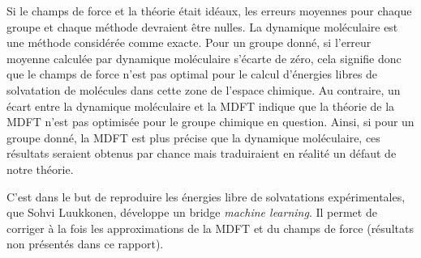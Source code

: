 Si le champs de force et la théorie était idéaux, les erreurs moyennes pour chaque groupe et chaque méthode devraient être nulles. La dynamique moléculaire est une méthode considérée comme exacte. Pour un groupe donné, si l'erreur moyenne calculée par dynamique moléculaire s'écarte de zéro, cela signifie donc que le champs de force n'est pas optimal pour le calcul d'énergies libres de solvatation de molécules dans cette zone de l'espace chimique. Au contraire, un écart entre la dynamique moléculaire et la MDFT indique que la théorie de la MDFT n'est pas optimisée pour le groupe chimique en question. Ainsi, si pour un groupe donné, la MDFT est plus précise que la dynamique moléculaire, ces résultats seraient obtenus par chance mais traduiraient en réalité un défaut de notre théorie. 

C'est dans le but de reproduire les énergies libre de solvatations expérimentales, que Sohvi Luukkonen, développe un bridge \textit{machine learning}. Il permet de corriger à la fois les approximations de la MDFT et du champs de force (résultats non présentés dans ce rapport).

